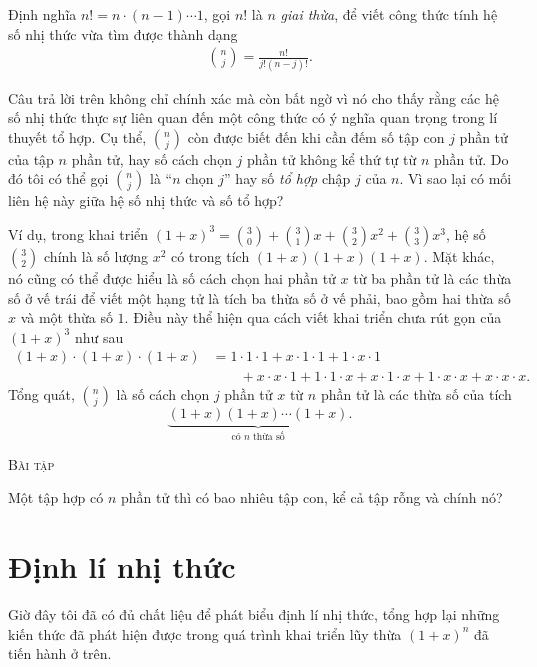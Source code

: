 \documentclass[12pt]{article} %
\newcounter{baitap} %
\newenvironment{baitap}[1][]{%
    \vspace{10pt} %
    \noindent\textsc{Bài tập #1} %
    \noindent
}{%
    \par
    \vspace{10pt} %
}
\begin{document}
Định nghĩa \(n!=n\cdot (n-1)\cdots 1\), gọi \(n!\) là \(n\) \emph{giai thừa}, để viết công thức tính hệ số nhị thức vừa tìm được thành dạng
\begin{align}
    \binom{n}{j} = \frac{n!}{j!(n-j)!}. \label{eq:tinh-he-so-nhi-thuc}
\end{align}

Câu trả lời trên không chỉ chính xác mà còn bất ngờ vì nó cho thấy rằng các hệ số nhị thức thực sự liên quan đến một công thức có ý nghĩa quan trọng trong lí thuyết tổ hợp. Cụ thể, \(\binom{n}{j}\) còn được biết đến khi cần đếm số tập con \(j\) phần tử của tập \(n\) phần tử, hay số cách chọn \(j\) phần tử không kể thứ tự từ \(n\) phần tử. Do đó tôi có thể gọi \(\binom{n}{j}\) là ``\(n\) chọn \(j\)'' hay số \emph{tổ hợp} chập \(j\) của \(n\). Vì sao lại có mối liên hệ này giữa hệ số nhị thức và số tổ hợp?

Ví dụ, trong khai triển \((1+x)^3=\binom{3}{0}+\binom{3}{1}x+\binom{3}{2}x^2+\binom{3}{3}x^3\), hệ số \(\binom{3}{2}\) chính là số lượng \(x^2\) có trong tích \((1+x)(1+x)(1+x)\). Mặt khác, nó cũng có thể được hiểu là số cách chọn hai phần tử \(x\) từ ba phần tử là các thừa số ở vế trái để viết một hạng tử là tích ba thừa số ở vế phải, bao gồm hai thừa số \(x\) và một thừa số \(1\). Điều này thể hiện qua cách viết khai triển chưa rút gọn của \((1+x)^3\) như sau
\begin{align*}
    (1+x) \cdot (1+x) \cdot (1+x)
        & = 1 \cdot 1 \cdot 1 + x \cdot 1 \cdot 1 + 1 \cdot x \cdot 1 \\
        & \qquad + x \cdot x \cdot 1 + 1 \cdot 1 \cdot x + x \cdot 1 \cdot x + 1 \cdot x \cdot x + x \cdot x \cdot x.
\end{align*}
Tổng quát, \(\binom{n}{j}\) là số cách chọn \(j\) phần tử \(x\) từ \(n\) phần tử là các thừa số của tích 
\[\underbrace{(1+x)(1+x)\cdots(1+x)}_{\text{có \(n\) thừa số}}.\]

\begin{baitap}
Một tập hợp có \(n\) phần tử thì có bao nhiêu tập con, kể cả tập rỗng và chính nó?
\end{baitap}


\section{Định lí nhị thức}

Giờ đây tôi đã có đủ chất liệu để phát biểu định lí nhị thức, tổng hợp lại những kiến thức đã phát hiện được trong quá trình khai triển lũy thừa \((1+x)^n\) đã tiến hành ở trên. 
\end{document}
